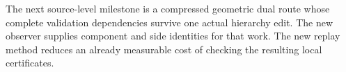 The next source-level milestone is a compressed geometric dual route whose
complete validation dependencies survive one actual hierarchy edit.
The new observer supplies component and side identities for that work.
The new replay method reduces an already measurable cost of checking the
resulting local certificates.
